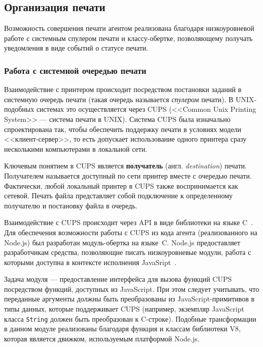 \documentclass[a4paper,14pt,href,draft]{article}
\def\CC{{C\nolinebreak[4]\hspace{-.05em}\raisebox{.4ex}{\tiny\bf ++}}}
\begin{document}
\subsection{Организация печати}
Возможность совершения печати агентом реализована благодаря низкоуровневой работе с системным спулером печати и классу-обертке,
позволяющему получать уведомления в виде событий о статусе печати.

\subsubsection{Работа с системной очередью печати}
Взаимодействие с принтером происходит посредством постановки заданий в системную очередь печати (такая очередь называется
\textit{спулером} печати). В UNIX-подобных системах это осуществляется через CUPS (<<Common Unix Printing System>> ---
система печати в UNIX). Система CUPS была изначально спроектирована так, чтобы обеспечить поддержку печати в условиях
модели <<клиент-сервер>>, то есть допускает использование одного принтера сразу несколькими компьютерами в локальной сети.

Ключевым понятием в CUPS является \textbf{получатель} (англ. \textit{destina\-ti\-on}) печати. Получателем называется
доступный по сети принтер вместе с очередью печати. Фактически, любой локальный принтер в CUPS также воспринимается как
сетевой. Печать файла представляет собой подключение к определенному получателю и постановку файла в очередь.

Взаимодействие с CUPS происходит через API в виде библиотеки на языке C~\cite{CUPSAPI}. Для обеспечения возможности работы с CUPS
из кода агента (реализованного на Node.js) был разработан модуль-обертка на языке~\CC. Node.js предоставляет разработчикам
средства, позволяющие писать низкоуровневые модули, работа с которыми доступна в контексте исполнения JavaSript~\cite{NodeJSAddons}.

Задача модуля --- предоставление интерфейса для вызова функций CUPS посредством функций, доступных из JavaScript.
При этом следует учитывать, что переданные аргументы должны быть преобразованы из JavaScript-примитивов в типы данных,
которые поддерживает CUPS (например, экземпляр JavaScript класса \texttt{String} должен быть преобразован к C-строке).
Подобные трансформации в данном модуле реализованы благодаря функция и классам библиотеки V8, которая является движком,
используемым платформой Node.js.
\end{document}
